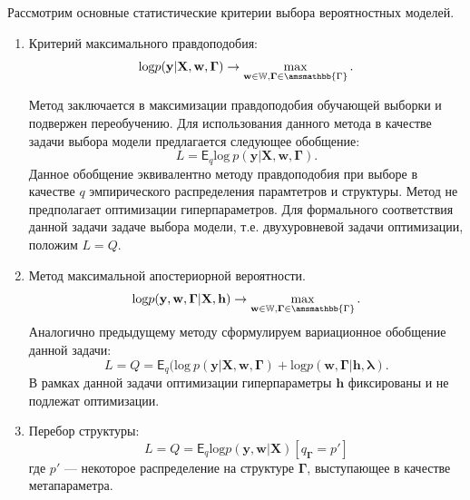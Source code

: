 Рассмотрим основные статистические критерии выбора вероятностных моделей. 
\begin{enumerate}
\item Критерий максимального правдоподобия:
\[\text{log}p(\mathbf{y}|\mathbf{X},\mathbf{w}, \boldsymbol{\Gamma})\to \max_{\mathbf{w}\in \mathbb{W}, \boldsymbol{\Gamma}\in \amsmathbb{\Gamma}}.\]

Метод заключается в максимизации правдоподобия обучающей выборки и подвержен переобучению.
Для использования данного метода в качестве задачи выбора модели предлагается следующее обобщение:
\begin{equation}
\label{eq:optim_ml}
    L =  \mathsf{E}_q \text{log}~p(\mathbf{y}|\mathbf{X}, \mathbf{w}, \boldsymbol{\Gamma}).
\end{equation}
Данное обобщение эквивалентно  методу правдоподобия при выборе в качестве $q$ эмпирического распределения парамтетров и структуры.
Метод не предполагает оптимизации гиперпараметров. Для формального соответствия данной задачи задаче выбора модели, т.е. двухуровневой задачи оптимизации, положим $L=Q$.


\item Метод максимальной апостериорной вероятности. 
\[\text{log}p(\mathbf{y},\mathbf{w},\boldsymbol{\Gamma}|\mathbf{X}, \mathbf{h} )\to \max_{\mathbf{w} \in \mathbb{W}, \boldsymbol{\Gamma}\in \amsmathbb{\Gamma}}.\]
Аналогично предыдущему методу сформулируем вариационное обобщение данной задачи:
\begin{equation}
\label{eq:optim_map}
L=Q =\mathsf{E}_q\bigl(\text{log}~p(\mathbf{y}|\mathbf{X}, \mathbf{w},\boldsymbol{\Gamma})+\text{log}p(\mathbf{w}, \boldsymbol{\Gamma}|\mathbf{h},\boldsymbol{\lambda}).
\end{equation}
В рамках данной задачи оптимизации гиперпараметры $\mathbf{h}$ фиксированы и не подлежат оптимизации.



\item Перебор структуры:
\begin{equation}
\label{eq:optim_struct}
    L =  Q = \mathsf{E}_q\text{log}p(\mathbf{y}, \mathbf{w}|\mathbf{X})[q_{\boldsymbol{\Gamma}} = p']
\end{equation}
где $p'$ --- некоторое распределение на структуре $\boldsymbol{\Gamma}$, выступающее в качестве метапараметра.





\end{enumerate}
